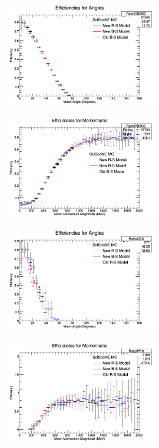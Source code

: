 \documentclass[11pt]{article}
\begin{document}
\begin{figure}[H]
\centering
\includegraphics[width=0.6\textwidth]{NMCombinedPlotsImages/22-NMCombinedPlots.png}
\caption{}
\end{figure}

\begin{figure}[H]
\centering
\includegraphics[width=0.6\textwidth]{NMCombinedPlotsImages/23-NMCombinedPlots.png}
\caption{}
\end{figure}

\begin{figure}[H]
\centering
\includegraphics[width=0.6\textwidth]{NMCombinedPlotsImages/24-NMCombinedPlots.png}
\caption{}
\end{figure}

\begin{figure}[H]
\centering
\includegraphics[width=0.6\textwidth]{NMCombinedPlotsImages/25-NMCombinedPlots.png}
\caption{}
\end{figure}
\end{document}
